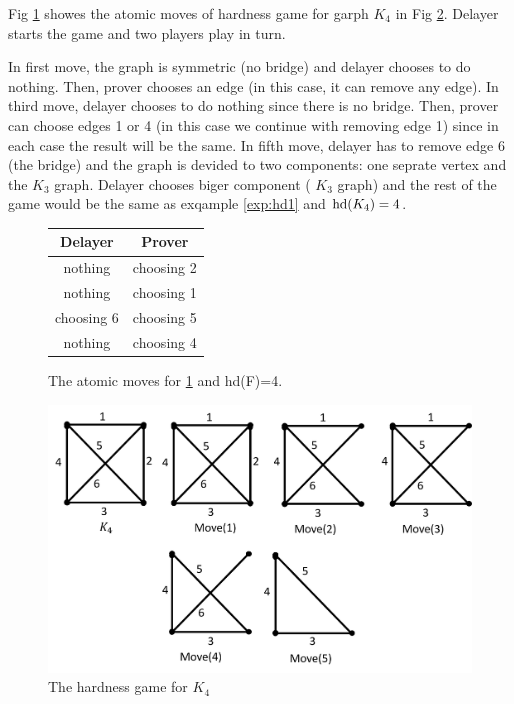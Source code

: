 \documentclass[12pt]{book}
\begin{document}
\begin{examp}\label{exp:hd2}
       Fig \ref{fig:game2} showes the atomic moves of hardness game for garph $K_4$ in Fig \ref{fig:hd2}. Delayer starts the game and two 
	   players play in turn. 
	   
	   In first move, the graph is symmetric (no bridge) and delayer chooses to do nothing. Then, prover chooses an edge (in this case, it can remove any edge). 
	   In third move, delayer chooses to do nothing since there is no bridge. Then, prover can choose edges 1 or 4 (in this case we continue with removing edge 1) since in each case 
	   the result will be the same. In fifth move, delayer has to remove edge 6 (the bridge) and the graph is devided to two components: 
	   one seprate vertex and the $K_3$ graph. Delayer chooses biger component ( $K_3$ graph) and the rest of the game would be the same as exqample \ref{exp:hd1} and $\operatorname{hd}(K_4)=4$.
	 
	 \begin{figure}[h]
      \centering
      \begin{tabular}{|c|c|} 
      \hline
                  Delayer & Prover \\ \hline
                  nothing & choosing 2  \\ \hline
                  nothing & choosing 1  \\ \hline
                  choosing 6 & choosing 5  \\ \hline
                  nothing & choosing 4 \\ \hline
      \end{tabular}
      \caption{The atomic moves for \ref{fig:game2} and hd(F)=4.}
      \label{fig:game2}
      \end{figure}
	  \begin{figure}
      \begin{center}
      \includegraphics[scale =0.6]{g2.png}
      \caption{The hardness game for $K_4$}
	  \label{fig:hd2}
      \end{center}
      \end{figure}
	   
\end{examp}
\end{document}
